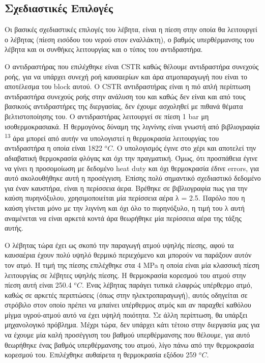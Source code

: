 \documentclass[11pt]{article}
\makeatletter
\newcommand{\citeprocitem}[2]{\hyper@linkstart{cite}{citeproc_bib_item_#1}#2\hyper@linkend}
\makeatother
\begin{document}
\subsection{Σχεδιαστικές Επιλογές}
\label{sec:org3cbc8ba}
Οι βασικές σχεδιαστικές επιλογές του λέβητα, είναι η πίεση στην οποία θα λειτουργεί ο λέβητας (πίεση εισόδου του νερού στον εναλλάκτη), ο βαθμός υπερθέρμανσης του λέβητα και οι συνθήκες λειτουργίας και ο τύπος του αντιδραστήρα.

Ο αντιδραστήρας που επιλέχθηκε είναι CSTR καθώς θέλουμε αντιδραστήρα συνεχούς ροής, για να υπάρχει συνεχή ροή καυσαερίων και άρα ατμοπαραγωγή που είναι το αποτέλεσμα του block αυτού. Ο CSTR αντιδραστήρας είναι η πιό απλή περίπτωση αντιδραστήρα συνεχούς ροής στην ανάλυση του και καθώς δεν είναι και από τους βασικούς αντιδραστήρες της διεργασίας, δεν έχουμε ασχοληθεί με πιθανά θέματα βελτιστοποίησης του. Ο αντιδραστήρας λειτουργεί σε πίεση 1 bar μη ισοθερμοκρασιακά. Η θερμογόνος δύναμη της λιγνίνης είναι γνωστή από βιβλιογραφία \textsuperscript{\citeprocitem{13}{13}} άρα μπορεί από αυτήν να υπολογιστεί η θερμοκρασία λειτουργίας του αντιδραστήρα η οποία είναι 1822 \(^oC\). Ο υπολογισμός έγινε στο χέρι και αποτελεί την αδιαβατική θερμοκρασία φλόγας και όχι την πραγματική. Όμως, ότι προσπάθεια έγινε να γίνει η προσομοίωση με δεδομένο heat duty και όχι θερμοκρασία έδινε errors, για αυτό ακολουθήθηκε αυτή η προσέγγιση. Επίσης πολύ σημαντικό σχεδιαστικό δεδομένο για έναν καυστήρα, είναι η περίσσεια άερα. Βρέθηκε σε βιβλιογραφία πως για την καύση πυρηνόξυλου, χρησιμοποιείται μία περίσσεια αέρα λ = 2.5. Παρόλο που η καύση γίνεται μόνο με την λιγνίνη και όχι όλο το πυρηνόξυλο, η τιμή του λ αυτή αναμένεται να είναι αρκετά κοντά άρα θεωρήθηκε μία περίσσεια αέρα της τάξης αυτής.

Ο λέβητας τώρα έχει ως σκοπό την παραγωγή ατμού υψηλής πίεσης, αφού τα καυσαέρια έχουν πολύ υψηλό θερμικό περιεχόμενο και μπορούν να παράξουν αυτόν τον ατμό. Η τιμή της πίεσης επιλέχθηκε στα 4 MPa η οποία είναι μία κλασσική πίεση λειτουργίας σε λέβητες υψηλής πίεσης. Η θερμοκρασία κορεσμού του ατμού στην πίεση αυτή είναι 250.4 \(^oC\). Ένας λέβητας παράγει τυπικά ελαφρώς υπέρθερμο ατμό, καθώς σε αρκετές περιπτώσεις (όπως στην ηλεκτροπαραγωγή), αυτός οδηγείται σε στρόβιλο στον οποίο πρέπει να μπαίνει υπέρθερμος ατμός και αν παραχθεί καθόλου μίγμα υγρού-ατμού αυτό να έχει υψηλή ποιότητα. Σε άλλη περίπτωση, θα υπάρξει μηχανολογικό πρόβλημα. Μέχρι τώρα, δεν υπάρχει κάτι τέτοιο στην διεργασία μας για να έχουμε μία καλή προσέγγιση του βαθμού υπερθέρμανσης που θέλουμε, για αυτό θεωρήθηκε ένας βαθμός υπερθέρμανσης του ατμού, λίγο πάνω από την θερμοκρασία κορεσμού του. Επιλέχθηκε αυθαίρετα η θερμοκρασία εξόδου 259 \(^oC\). 
\end{document}
